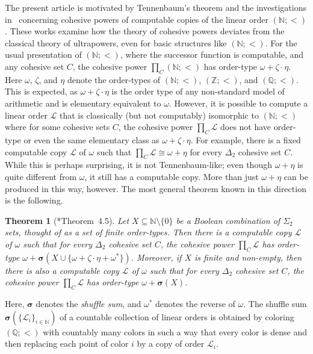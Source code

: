\documentclass[11pt,a4paper,reqno]{amsart}
\newtheorem{Theorem}{Theorem}[section]
\theoremstyle{definition}
\newcommand{\iso}{\cong}
\newcommand{\Nb}{\mathbb{N}}
\newcommand{\Zb}{\mathbb{Z}}
\newcommand{\Qb}{\mathbb{Q}}
\newcommand{\mc}[1]{\mathcal{#1}}
\begin{document}
The present article is motivated by Tennenbaum's theorem and the investigations in~\cites{CohPowJournal, ShaferCohPowDelta2} concerning cohesive powers of computable copies of the linear order $(\Nb; <)$.  These works examine how the theory of cohesive powers deviates from the classical theory of ultrapowers, even for basic structures like $(\Nb; <)$.  For the usual presentation of $(\Nb; <)$, where the successor function is computable, and any cohesive set $C$, the cohesive power $\prod_C (\Nb; <)$ has order-type $\omega + \zeta\cdot\eta$.
 Here $\omega$, $\zeta$, and $\eta$ denote the order-types of $(\Nb; <)$, $(\Zb; <)$, and $(\Qb; <)$.
This is expected, as $\omega + \zeta\cdot\eta$ is the order type of any non-standard model of arithmetic and is elementary equivalent to $\omega$.  However, it is possible to compute a linear order $\mc{L}$ that is classically (but not computably) isomorphic to $(\Nb; <)$ where for some cohesive sets $C$, the cohesive power $\prod_C \mc{L}$ does not have order-type or even the same elementary class as $\omega + \zeta\cdot\eta$.  For example, there is a fixed computable copy $\mc{L}$ of $\omega$ such that $\prod_C \mc{L} \iso \omega + \eta$ for every $\Delta_2$ cohesive set $C$.  While this is perhaps surprising, it is not Tennenbaum-like; even though $\omega + \eta$ is quite different from $\omega$, it still has a computable copy.  More than just $\omega + \eta$ can be produced in this way, however. The most general theorem known in this direction is the following.

\begin{Theorem}[\cite{ShaferCohPowDelta2}*{Theorem~4.5}]\label{thm-BCSigma2ShuffleNew}
Let $X \subseteq \Nb \setminus \{0\}$ be a Boolean combination of $\Sigma_2$ sets, thought of as a set of finite order-types.  Then there is a computable copy $\mc{L}$ of $\omega$ such that for every $\Delta_2$ cohesive set $C$, the cohesive power $\prod_C \mc{L}$ has order-type $\omega + \bm{\sigma}(X \cup \{\omega + \zeta \cdot \eta + \omega^*\})$.  Moreover, if $X$ is finite and non-empty, then there is also a computable copy $\mc{L}$ of $\omega$ such that for every $\Delta_2$ cohesive set $C$, the cohesive power $\prod_C \mc{L}$ has order-type $\omega + \bm{\sigma}(X)$.
\end{Theorem}

\noindent
Here, $\bm{\sigma}$ denotes the \emph{shuffle sum}, and $\omega^*$ denotes the reverse of $\omega$.  The shuffle sum $\bm{\sigma}(\{\mc{L}_i\}_{i \in \Nb})$ of a countable collection of linear orders is obtained by coloring $(\Qb; <)$ with countably many colors in such a way that every color is dense and then replacing each point of color $i$ by a copy of order $\mc{L}_i$.
\end{document}

